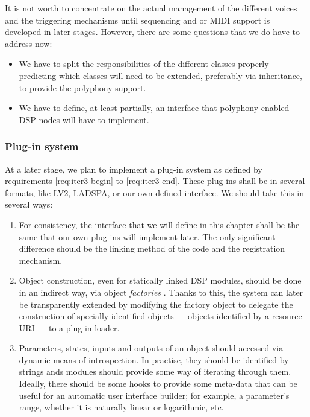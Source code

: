 It is not worth to concentrate on the actual management of the
different voices and the triggering mechanisms until sequencing and or
MIDI support is developed in later stages. However, there are some
questions that we do have to address now:
\begin{itemize}
\item We have to split the responsibilities of the different classes
properly predicting which classes will need to be extended, preferably
via inheritance, to provide the polyphony support.

\item We have to define, at least partially, an interface that
  polyphony enabled DSP nodes will have to implement.
\end{itemize}

\subsubsection{Plug-in system}

At a later stage, we plan to implement a plug-in system as defined by
requirements \ref{req:iter3-begin} to \ref{req:iter3-end}. These
plug-ins shall be in several formats, like LV2, LADSPA, or our own
defined interface. We should take this in several ways:
\begin{enumerate}
\item For consistency, the interface that we will define in this
  chapter shall be the same that our own plug-ins will implement
  later. The only significant difference should be the linking method
  of the code and the registration mechanism.

\item Object construction, even for statically linked DSP modules,
  should be done in an indirect way, via object \emph{factories}
  \cite{gamma95design}. Thanks to this, the system can later be
  transparently extended by modifying the factory object to delegate
  the construction of specially-identified objects --- objects
  identified by a resource URI \cite{mealling02rfc3305} --- to a plug-in
  loader.

\item Parameters, states, inputs and outputs of an object should
  accessed via dynamic means of introspection. In practise, they
  should be identified by strings ands modules should provide some way
  of iterating through them. Ideally, there should be some hooks to
  provide some meta-data that can be useful for an automatic user
  interface builder; for example, a parameter's range, whether it is
  naturally linear or logarithmic, etc.
\end{enumerate}

